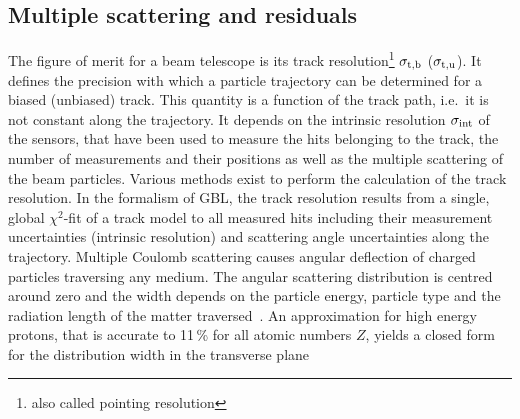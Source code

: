 \subsection{Multiple scattering and residuals}
\label{sec:resmultiple}

The figure of merit for a beam telescope is its track resolution\footnote{also called pointing resolution} $\sigma_{\textrm{t,b}}$ ($\sigma_{\textrm{t,u}}$).
It defines the precision with which a particle trajectory can be determined for a biased (unbiased) track. 
This quantity is a function of the track path, i.e.\ it is not constant along the trajectory. 
It depends on the intrinsic resolution $\sigma_{\textrm{int}}$ of the sensors, that have been used to measure the hits belonging to the track, the number of measurements and their positions
 as well as the multiple scattering of the beam particles.
Various methods exist to perform the calculation of the track resolution. 
In the formalism of GBL, the track resolution results from a single, global $\chi^2$-fit of a track model to all measured hits including their measurement uncertainties (intrinsic resolution)
 and scattering angle uncertainties along the trajectory. 
% 
%
%
%
%
%
Multiple Coulomb scattering causes angular deflection of charged particles traversing any medium.
The angular scattering distribution is centred around zero
 and the width depends on the particle energy, particle type and the radiation length of the matter traversed~\cite{ref:scatteringhighland}.
An approximation for high energy protons, that is accurate to 11\,\% for all atomic numbers $Z$, yields a closed form for the distribution width in the transverse plane~\cite{ref:PDG-2014}

